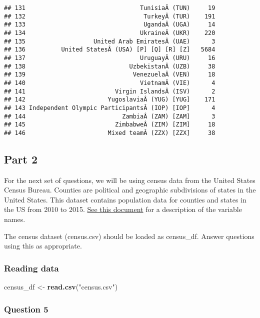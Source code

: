 \documentclass[
]{article}
\newenvironment{Shaded}{\begin{snugshade}}{\end{snugshade}}
\newcommand{\KeywordTok}[1]{\textcolor[rgb]{0.13,0.29,0.53}{\textbf{#1}}}
\newcommand{\NormalTok}[1]{#1}
\newcommand{\StringTok}[1]{\textcolor[rgb]{0.31,0.60,0.02}{#1}}
\begin{document}
\begin{verbatim}
## 131                                TunisiaÂ (TUN)     19
## 132                                 TurkeyÂ (TUR)    191
## 133                                 UgandaÂ (UGA)     14
## 134                                UkraineÂ (UKR)    220
## 135                   United Arab EmiratesÂ (UAE)      3
## 136          United StatesÂ (USA) [P] [Q] [R] [Z]   5684
## 137                                UruguayÂ (URU)     16
## 138                             UzbekistanÂ (UZB)     38
## 139                              VenezuelaÂ (VEN)     18
## 140                                VietnamÂ (VIE)      4
## 141                         Virgin IslandsÂ (ISV)      2
## 142                       YugoslaviaÂ (YUG) [YUG]    171
## 143 Independent Olympic ParticipantsÂ (IOP) [IOP]      4
## 144                           ZambiaÂ (ZAM) [ZAM]      3
## 145                         ZimbabweÂ (ZIM) [ZIM]     18
## 146                       Mixed teamÂ (ZZX) [ZZX]     38
\end{verbatim}

\hypertarget{part-2}{%
\subsection{Part 2}\label{part-2}}

For the next set of questions, we will be using census data from the
United States Census Bureau. Counties are political and geographic
subdivisions of states in the United States. This dataset contains
population data for counties and states in the US from 2010 to 2015.
\href{https://www.dropbox.com/s/a0c2fdkaxokk2ys/CO-EST2015-alldata.pdf?dl=0}{See
this document} for a description of the variable names.

The census dataset (census.csv) should be loaded as census\_df. Answer
questions using this as appropriate.

\hypertarget{reading-data}{%
\subsubsection{Reading data}\label{reading-data}}

\begin{Shaded}
\begin{Highlighting}[]
\NormalTok{census_df <-}\StringTok{ }\KeywordTok{read.csv}\NormalTok{(}\StringTok{"census.csv"}\NormalTok{)}
\end{Highlighting}
\end{Shaded}

\hypertarget{question-5}{%
\subsubsection{Question 5}\label{question-5}}
\end{document}
